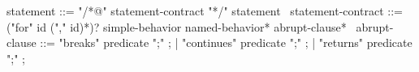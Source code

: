 \begin{syntax}
  statement ::= "/*@" statement-contract "*/" statement
  \
  statement-contract ::= ("for" id ("," id)*)? simple-behavior named-behavior* abrupt-clause*
  \
  abrupt-clause ::= "breaks" predicate ";" ;
  | "continues" predicate ";" ;
  | "returns" predicate ";" ;
\end{syntax}
